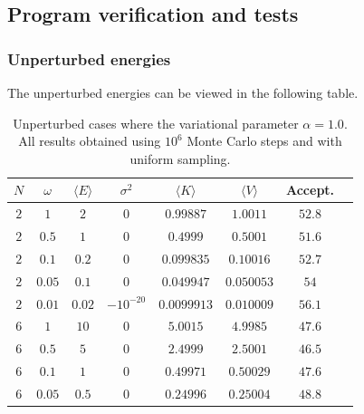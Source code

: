 \documentclass[11pt]{article}
\begin{document}
\subsection{Program verification and tests}
\subsubsection{Unperturbed energies}
The unperturbed energies can be viewed in the following table.

\begin{table}[H]
	\centering
	\caption{Unperturbed cases where the variational parameter $\alpha=1.0$. All results obtained using $10^6$ Monte Carlo steps and with uniform sampling.}
	\begin{tabular}{c c c c c c c c}
		\\ \hline \hline
		$N$ 			  &       $\omega$   &$\langle E \rangle$ &     $\sigma^2$ &$\langle K\rangle$ &$\langle V \rangle$ &     Accept. \\ \hline
		$              2$ &$              1$ &$              2$ &$              0$ &$        0.99887$ &$         1.0011$ & $           52.8$ \\ 
		$              2$ &$            0.5$ &$              1$ &$              0$ &$         0.4999$ &$         0.5001$ & $           51.6$ \\ 
		$              2$ &$            0.1$ &$            0.2$ &$              0$ &$       0.099835$ &$        0.10016$ & $           52.7$ \\ 
		$              2$ &$           0.05$ &$            0.1$ &$              0$ &$       0.049947$ &$       0.050053$ & $             54$ \\ 
		$              2$ &$           0.01$ &$           0.02$ &$      -10^{-20}$ &$      0.0099913$ &$       0.010009$ & $           56.1$ \\ 
		$              6$ &$              1$ &$             10$ &$              0$ &$         5.0015$ &$         4.9985$ & $           47.6$ \\ 
		$              6$ &$            0.5$ &$              5$ &$              0$ &$         2.4999$ &$         2.5001$ & $           46.5$ \\ 
		$              6$ &$            0.1$ &$              1$ &$              0$ &$        0.49971$ &$        0.50029$ & $           47.6$ \\ 
		$              6$ &$           0.05$ &$            0.5$ &$              0$ &$        0.24996$ &$        0.25004$ & $           48.8$ \\ 

\end{tabular}
\end{table}
\end{document}
